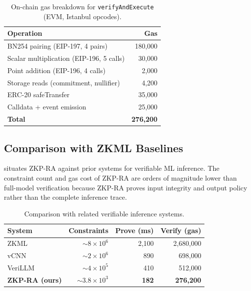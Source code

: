 \documentclass[final,5p,times,twocolumn]{elsarticle}
\theoremstyle{plain}
\theoremstyle{definition}
\theoremstyle{remark}
\begin{document}
\begin{table}[h]
\centering
\caption{On-chain gas breakdown for \texttt{verifyAndExecute} (EVM, Istanbul opcodes).}
\label{tab:gas}
\begin{tabular}{lr}
\toprule
\textbf{Operation} & \textbf{Gas} \\
\midrule
BN254 pairing (EIP-197, 4 pairs)         & 180{,}000 \\
Scalar multiplication (EIP-196, 5 calls) &  30{,}000 \\
Point addition (EIP-196, 4 calls)        &   2{,}000 \\
Storage reads (commitment, nullifier)    &   4{,}200 \\
ERC-20 safeTransfer                      &  35{,}000 \\
Calldata + event emission                &  25{,}000 \\
\midrule
\textbf{Total}                           & \textbf{276{,}200} \\
\bottomrule
\end{tabular}
\end{table}

\subsection{Comparison with ZKML Baselines}

 situates ZKP-RA against prior systems for verifiable ML
inference. The constraint count and gas cost of ZKP-RA are orders of magnitude
lower than full-model verification because ZKP-RA proves input integrity and
output policy rather than the complete inference trace.

\begin{table}[h]
\centering
\caption{Comparison with related verifiable inference systems.}
\label{tab:comparison}
\begin{tabular}{lrrr}
\toprule
\textbf{System} & \textbf{Constraints} & \textbf{Prove (ms)} & \textbf{Verify (gas)} \\
\midrule
ZKML~\cite{chen2024zkml}       & $\sim\!8\times10^6$ & 2{,}100  & 2{,}680{,}000 \\
vCNN~\cite{vcnn2024}           & $\sim\!2\times10^6$ & 890      & 698{,}000 \\
VeriLLM~\cite{verillm2025}     & $\sim\!4\times10^5$ & 410      & 512{,}000 \\
\textbf{ZKP-RA (ours)}         & $\sim\!3.8\times10^3$ & \textbf{182} & \textbf{276{,}200} \\
\bottomrule
\end{tabular}
\end{table}
\end{document}
